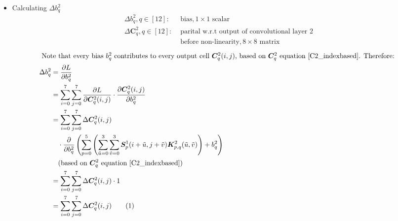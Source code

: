 \documentclass[12pt]{article}
\newcommand\numberthis{\stepcounter{equation}\tag{\theequation}}
\begin{document}
\begin{itemize}
\item Calculating $\Delta b^2_q$
\begin{align*}
    \Delta b^2_q, q \in [12]:& \text{ bias}, 1 \times 1 \text{ scalar}\\
    \Delta \bm{C}_{q}^2, q \in [12]:& \text{ parital w.r.t output of convolutional layer 2} \\& \text{ before non-linearity}, 8 \times 8 \text{ matrix}
\end{align*}
\begin{align*}
    \intertext{
    Note that every bias $b^2_q$ contributes to every output cell $\bm{C}_{q}^2(i, j)$, based on $\bm{C}_{q}^2$ equation $\eqref{C2_indexbased}$. Therefore:
    }
    \Delta b^2_q
    &= \frac{\partial L}{\partial b^2_q}
    \\
    &= \sum_{i=0}^{7}\sum_{j=0}^{7}\frac{\partial L}{\partial\bm{C}_{q}^2(i, j)}
    \cdot
    \frac{\partial\bm{C}_{q}^2(i, j)}{\partial b^2_q}
    \\
    &= \sum_{i=0}^{7}\sum_{j=0}^{7}\Delta \bm{C}_{q}^2(i, j)\\
    &\quad\cdot
    \frac{\partial}{\partial b^2_q}
    \left(\sum_{p = 0}^5\left(\sum_{\Tilde{u} = 0}^3\sum_{\Tilde{v} = 0}^3\bm{S}^1_p(i + \Tilde{u}, j + \Tilde{v})\bm{K}^2_{p, q}(\Tilde{u}, \Tilde{v})\right) + b^2_q\right)
    \\
    &\quad (\text{based on $\bm{C}_{q}^2$ equation } \eqref{C2_indexbased})
    \\
    &= \sum_{i=0}^{7}\sum_{j=0}^{7}\Delta \bm{C}_{q}^2(i, j)
    \cdot 1\\
    &= \sum_{i=0}^{7}\sum_{j=0}^{7}\Delta \bm{C}_{q}^2(i, j)
    \numberthis \label{delta_b2}
\end{align*}
\end{itemize}
\end{document}
